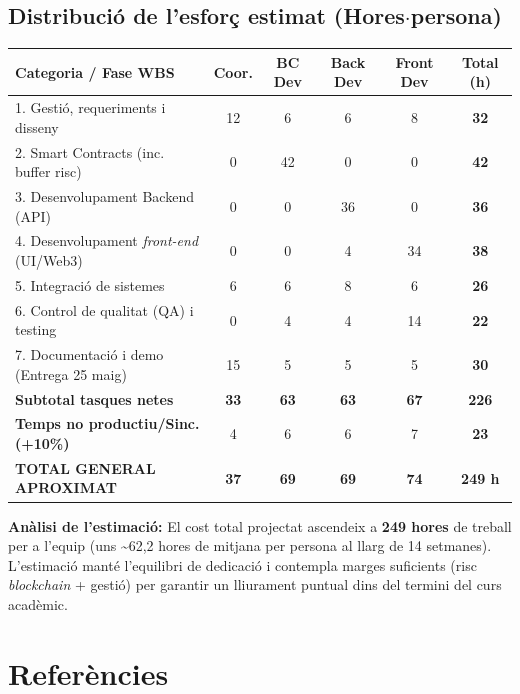 \documentclass[12pt,a4paper]{article}
\begin{document}
\subsection{Distribució de l'esforç estimat (Hores$\cdot$persona)}
\begin{center}
\renewcommand{\arraystretch}{1.3}
\begin{tabular}{|l|c|c|c|c||c|}
\hline
\textbf{Categoria / Fase WBS} & \textbf{Coor.} & \textbf{BC Dev} & \textbf{Back Dev} & \textbf{Front Dev} & \textbf{Total (h)} \\ \hline
1. Gestió, requeriments i disseny & 12 & 6 & 6 & 8 & \textbf{32} \\ \hline
2. Smart Contracts (inc. buffer risc) & 0 & 42 & 0 & 0 & \textbf{42} \\ \hline
3. Desenvolupament Backend (API) & 0 & 0 & 36 & 0 & \textbf{36} \\ \hline
4. Desenvolupament \textit{front-end} (UI/Web3) & 0 & 0 & 4 & 34 & \textbf{38} \\ \hline
5. Integració de sistemes & 6 & 6 & 8 & 6 & \textbf{26} \\ \hline
6. Control de qualitat (QA) i testing & 0 & 4 & 4 & 14 & \textbf{22} \\ \hline
7. Documentació i demo (Entrega 25 maig)& 15 & 5 & 5 & 5 & \textbf{30} \\ \hline
\hline
\textbf{Subtotal tasques netes} & \textbf{33} & \textbf{63} & \textbf{63} & \textbf{67} & \textbf{226} \\ \hline
\textbf{Temps no productiu/Sinc. (+10\%)} & 4 & 6 & 6 & 7 & \textbf{23} \\ \hline
\hline
\textbf{TOTAL GENERAL APROXIMAT} & \textbf{37} & \textbf{69} & \textbf{69} & \textbf{74} & \textbf{249 h} \\ \hline
\end{tabular}
\end{center}

\vspace{0.3cm}
\textbf{Anàlisi de l'estimació:} El cost total projectat ascendeix a \textbf{249 hores} de treball per a l'equip (uns \textasciitilde 62,2 hores de mitjana per persona al llarg de 14 setmanes). L'estimació manté l'equilibri de dedicació i contempla marges suficients (risc \textit{blockchain} + gestió)  per garantir un lliurament puntual dins del termini del curs acadèmic.

\section{Referències}
\end{document}
